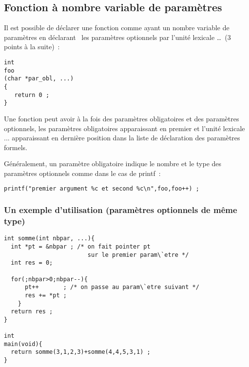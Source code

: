 \begin{frame}[fragile]
  \section{Fonction \`a nombre variable de param\`etres}%
  Il est possible de d\'eclarer une fonction comme ayant un nombre
  variable de param\`etres en \og d\'eclarant \fg\ les param\`etres optionnels
  par l'unit\'e lexicale \ldots\ (3 points \`a la suite)~:
\begin{verbatim}
int 
foo
(char *par_obl, ...)
{
   return 0 ;
}
\end{verbatim}
  Une fonction peut avoir \`a la fois des param\`etres obligatoires et des
  param\`etres optionnels, les param\`etres obligatoires apparaissant en
  premier et l'unit\'e lexicale ... apparaissant en derni\`ere position
  dans la liste de d\'eclaration des param\`etres formels.
  \par
  G\'en\'eralement, un param\`etre obligatoire indique le nombre et le
  type des param\`etres optionnels comme dans le cas de printf~:
\begin{verbatim}
printf("premier argument %c et second %c\n",foo,foo++) ;
\end{verbatim}
\end{frame}
\begin{frame}[fragile]
  \frametitle{Un exemple d'utilisation (param\`etres optionnels de m\^eme type)}
\begin{verbatim}
int somme(int nbpar, ...){
  int *pt = &nbpar ; /* on fait pointer pt 
                        sur le premier param\`etre */
  int res = 0; 

  for(;nbpar>0;nbpar--){
      pt++       ; /* on passe au param\`etre suivant */
      res += *pt ;
    }
  return res ;
}

int 
main(void){
  return somme(3,1,2,3)+somme(4,4,5,3,1) ;
}
\end{verbatim}
\end{frame}
